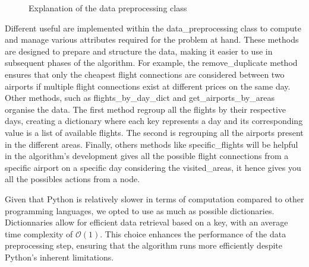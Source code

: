 \begin{figure}[!ht]
    \caption{Explanation of the data preprocessing class}
    \label{fig:data_preprocessing_class}
\end{figure}

Different useful  are implemented within the data\_preprocessing class to compute and manage various attributes required for the problem at hand. These methods are designed to prepare and structure the data, making it easier to use in subsequent phases of the algorithm.
For example, the remove\_duplicate method ensures that only the cheapest flight connections are considered between two airports if multiple flight connections exist at different prices on the same day.
Other methods, such as flights\_by\_day\_dict and get\_airports\_by\_areas organise the data. The first method regroup all the flights by their respective days, creating a dictionary where each key represents a day and its corresponding value is a list of available flights. The second is regrouping all the airports present in the different areas.
Finally, others methods like specific\_flights will be helpful in the algorithm's development gives all the possible flight connections from a specific airport on a specific day considering the visited\_areas, it hence gives you all the possibles actions from a node.

Given that Python is relatively slower in terms of computation compared to other programming languages, we opted to use as much as possible dictionaries. Dictionnaries allow for efficient data retrieval based on a key, with an average time complexity of $\mathcal{O}(1)$. This choice enhances the performance of the data preprocessing step, ensuring that the algorithm runs more efficiently despite Python’s inherent limitations.

\newpage
